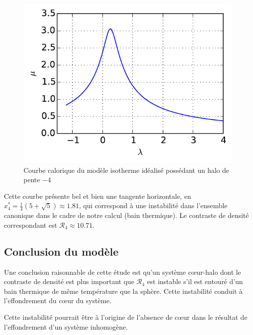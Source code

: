 	\begin{figure}
		\centering \includegraphics{theorie/graphe/alpha_4.pdf}
		\caption{Courbe calorique du modèle isotherme idéalisé possédant un halo de pente $-4$ \label{fig::DET}}
	\end{figure}

	Cette courbe présente bel et bien une tangente horizontale, en $x^*_4= \frac{1}{4} \left(5+\sqrt{5}\right) \approx 1.81$, qui correspond à une
	instabilité dans l'ensemble canonique dans le cadre de notre calcul (bain thermique). Le contraste de densité correspondant est
	$\mathcal{R}_4\approx 10.71$.

\subsection{Conclusion du modèle}

	Une conclusion raisonnable de cette étude est qu'un système cœur-halo dont le contraste de densité est plus important que $\mathcal{R}_4$ est
	instable s'il est entouré d'un bain thermique de même température que la sphère. Cette instabilité conduit à l'effondrement du cœur du
	système.

	Cette instabilité pourrait être à l'origine de l'absence de cœur dans le résultat de l'effondrement d'un système inhomogène.

